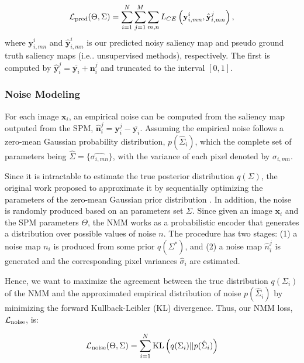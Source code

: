 \documentclass{article}
\makeatletter
\DeclareRobustCommand\onedot{\futurelet\@let@token\@onedot}
\def\@onedot{\ifx\@let@token.\else.\null\fi\xspace}
\def\ie{i.e\onedot} \def\Ie{I.e\onedot}
\makeatother
\begin{document}
\begin{equation}
  \mathcal{L}_{\textnormal{pred}}(\Theta,\Sigma) = \sum_{i=1}^{N}\sum_{j=1}^{M}\sum_{m,n} L_{CE} \left(\textbf{y}_{i,mn}^{i}, \hat{\textbf{y}}_{i,mn}^{j} \right),
  \label{eq:pred_loss}
\end{equation}
where $\textbf{y}_{i,mn}^{i}$ and $\hat{\textbf{y}}_{i,mn}^{i}$ is our predicted noisy saliency map and pseudo ground truth saliency maps (\ie unsupervised methods), respectively. The first is computed by $\boldsymbol{\hat{y}}_i^{j} = \bar{\boldsymbol{y}_i} + \boldsymbol{n}^{j}_i$ and truncated to the interval $[0,1]$.

\subsubsection{Noise Modeling}
\label{section:NMM}

For each image $\boldsymbol{x}_i$, an empirical noise can be computed from the saliency map outputed from the SPM, $\hat{\boldsymbol{n}}^j_i = \boldsymbol{y}_i^{j} - \bar{\boldsymbol{y}_i}$. Assuming the empirical noise follows a zero-mean Gaussian probability distribution, $p(\hat{\Sigma}_i)$, which the complete set of parameters being $\hat{\Sigma} = \{\hat{\sigma_{i, mn}}\}$, with the variance of each pixel denoted by $\sigma_{i, mn}$.

Since it is intractable to estimate the true posterior distribution $q(\Sigma)$, the original work proposed to approximate it by sequentially optimizing the parameters of the zero-mean Gaussian prior distribution \cite{zhang2018}. In addition, the noise is randomly produced based on an parameters set $\Sigma$. Since given an image $\boldsymbol{x}_i$ and the SPM parameters $\Theta$, the NMM works as a probabilistic encoder that generates a distribution over possible values of noise $n$. The procedure has two stages: (1) a noise map $n_i$ is produced from some prior $q(\Sigma^*)$, and (2) a noise map $\hat{n}_i^j$ is generated and the corresponding pixel variances $\hat{\sigma}_i$ are estimated.

Hence, we want to maximize the agreement between the true distribution $q(\Sigma_i)$ of the NMM and the approximated empirical distribution of noise $p(\hat{\Sigma}_i)$ by minimizing the forward Kullback-Leibler (KL) divergence. Thus, our NMM loss, $\mathcal{L}_{\textnormal{noise}}$, is: 

\begin{equation}
  \mathcal{L}_{\textnormal{noise}}(\Theta,\Sigma) = \sum_{i=1}^N \mathrm{KL} \left(q(\Sigma_i) || p(\hat{\Sigma}_i) \right)
  \label{eq:noise_loss}
\end{equation}
\end{document}
